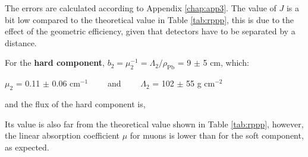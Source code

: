 
The errors are calculated according to Appendix \ref{chap:app3}. The value of $J$ is a bit low compared to the theoretical value in Table \ref{tab:rppp}, this is due to the effect of the geometric efficiency, given that detectors have to be separated by a distance.

For the \textbf{hard component}, $b_2 = \mu_2^{-1} = \Lambda_2 / \rho_\text{Pb}$ = 9 $\pm$ 5 cm, which:

\bc $\mu_2$ = 0.11 $\pm$ 0.06 cm$^{-1} \qquad$ and $\qquad \Lambda_2$ = 102 $\pm$ 55 g cm$^{-2}$\ec

and the flux of the hard component is,


Its value is also far from the theoretical value shown in Table \ref{tab:rppp}, however, the linear absorption coefficient $\mu$ for muons is lower than for the soft component, as expected.

